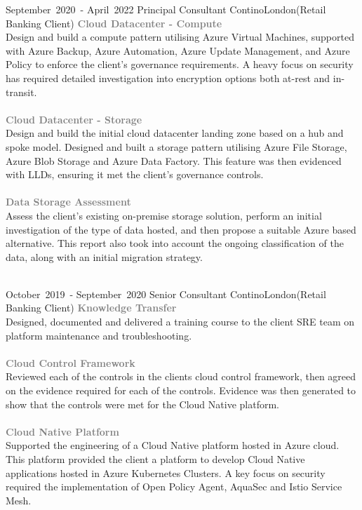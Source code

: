 \cventry %
  {\mbox{September 2020 -} \mbox{April 2022}}
  {Principal Consultant}
  {Contino}{London}{(Retail Banking Client)}
  { 
    \textcolor{gray}{\textbf{Cloud Datacenter - Compute}}\\ 
    Design and build a compute pattern utilising Azure Virtual Machines, 
    supported with Azure Backup, Azure Automation, Azure Update Management,
    and Azure Policy to enforce the client's governance requirements.
    A heavy focus on security has required detailed investigation into 
    encryption options both at-rest and in-transit.\\\\
    \textcolor{gray}{\textbf{Cloud Datacenter - Storage}}\\ 
    Design and build the initial cloud datacenter landing zone based on
    a hub and spoke model. Designed and built a storage pattern utilising
    Azure File Storage, Azure Blob Storage and Azure Data Factory. This 
    feature was then evidenced with LLDs, ensuring it met the client's 
    governance controls.\\\\
    \textcolor{gray}{\textbf{Data Storage Assessment}}\\ 
    Assess the client's existing on-premise storage solution, perform
    an initial investigation of the type of data hosted, and then
    propose a suitable Azure based alternative. This report also took
    into account the ongoing classification of the data, along with 
    an initial migration strategy.\\\\
  }

\cventry %
  {\mbox{October 2019 -} \mbox{September 2020}}
  {Senior Consultant}
  {Contino}{London}{(Retail Banking Client)}
  {
    \textcolor{gray}{\textbf{Knowledge Transfer}}\\
    Designed, documented and delivered a training course
    to the client SRE team on platform maintenance and troubleshooting.\\\\
    \textcolor{gray}{\textbf{Cloud Control Framework}}\\
    Reviewed each of the controls in the clients cloud control framework, 
    then agreed on the evidence required for each of the controls. 
    Evidence was then generated to show that the controls were met for the 
    Cloud Native platform.\\\\
    \textcolor{gray}{\textbf{Cloud Native Platform}}\\
    Supported the engineering of a Cloud Native platform hosted in Azure cloud. 
    This platform provided the client a platform to develop Cloud Native applications
    hosted in Azure Kubernetes Clusters. A key focus on security required the implementation
    of Open Policy Agent, AquaSec and Istio Service Mesh.\\
  }

